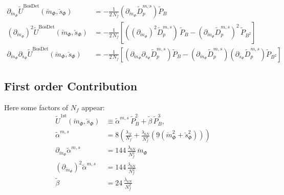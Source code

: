 % 
% 
\begin{align}\label{eq:CEP_derivative_dm_bosonicContribution_rescaled}
 \partial_{\breve m_{\Phi}}  \tilde U^{\text{BosDet}}(\breve m_{\Phi}, \breve s_{\Phi}) & = 
                                  - \frac{1}{2\,N_f} \left( \partial_{\breve m_{\Phi}} \tilde D_p^{m,s} \right) \tilde P_B 
%         
        \\ \label{eq:CEP_derivative_dmdm_bosonicContribution_rescaled}
 \left(\partial_{\breve m_{\Phi}} \right)^2 \tilde U^{\text{BosDet}}(\breve m_{\Phi}, \breve s_{\Phi}) & = 
                                  - \frac{1}{2\,N_f}\left[ \left( \left(\partial_{\breve m_{\Phi}}\right)^2 \tilde D_p^{m,s} \right) \, \tilde P_B
                                  - \left( \partial_{\breve m_{\Phi}} \tilde D_p^{m,s} \right)^2 \, \tilde P_{B^2}    \right]
%               
         \\ \label{eq:CEP_derivative_dmds_bosonicContribution_rescaled}
\partial_{\breve m_{\Phi}} \partial_{\breve s_{\Phi}}  \tilde U^{\text{BosDet}}(\breve m_{\Phi}, \breve s_{\Phi}) & = 
                                  - \frac{1}{2\,N_f} \left[ \left( \partial_{\breve m_{\Phi}} \partial_{\breve s_{\Phi}} \tilde D_p^{m,s} \right) \tilde P_B 
                                  - \left( \partial_{\breve m_{\Phi}}  \tilde D_p^{m,s} \right)\left( \partial_{\breve s_{\Phi}}  \tilde D_p^{m,s} \right)\tilde P_{B^2} \right]
\end{align}
% 
\subsection*{First order Contribution}
Here some factors of $N_f$ appear:
\begin{align}\label{eq:CEP_firstWithDet_shortcuts_rescaled}
 \tilde U^{\text{1st}}(\breve m_{\Phi}, \breve s_{\Phi}) & \equiv \tilde \alpha^{m, s}\, \tilde P_B^2 + \tilde \beta\, \tilde P_B^3,
%  
        \\ \label{CE:CEP_firstWithDet_shrotcut_alpha_rescaled}
 \tilde \alpha^{m, s}  & = 8 \left(\frac{\lambda_N}{N_f} + \frac{\lambda_{6N}}{N_f^2}\left( 9\left( \breve m_{\Phi}^2 + \breve s_{\Phi}^2 \right) \right) \right)
%  
        \\ \label{CE:CEP_firstWithDet_shrotcut_dm_alpha_rescaled}
 \partial_{\breve m_{\Phi}} \tilde \alpha^{m, s}  & = 144\, \frac{\lambda_{6N}}{N_f^2}\, \breve m_{\Phi}
%  
        \\ \label{CE:CEP_firstWithDet_shrotcut_dmdm_alpha_rescaled}
 \left(\partial_{\breve m_{\Phi}}\right)^2 \tilde \alpha^{m, s}  & = 144\, \frac{\lambda_{6N}}{N_f^2}
%  
        \\ \label{CE:CEP_firstWithDet_shrotcut_beta_rescaled}
 \tilde \beta  & = 24\, \frac{\lambda_{6N}}{N_f^2}
\end{align}

